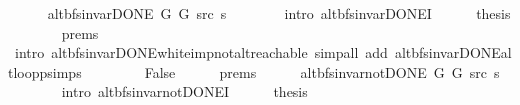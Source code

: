 \begin{isabellebody}
\ \ \ \ \isamarkupfalse%
\ {\isachardoublequoteopen}alt{\isacharunderscore}{\kern0pt}bfs{\isacharunderscore}{\kern0pt}invar{\isacharunderscore}{\kern0pt}DONE{\isacharprime}{\kern0pt}\ G{}\ G{}\ src\ s{\isachardoublequoteclose}\isanewline
\ \ \ \ \ \ \isamarkupfalse%
\ {\isacharparenleft}{\kern0pt}intro\ alt{\isacharunderscore}{\kern0pt}bfs{\isacharunderscore}{\kern0pt}invar{\isacharunderscore}{\kern0pt}DONE{\isacharprime}{\kern0pt}I{\isacharparenright}{\kern0pt}\isanewline
\ \ \ \ \isamarkupfalse%
\ {\isacharquery}{\kern0pt}thesis\isanewline
\ \ \ \ \ \ \isamarkupfalse%
\ {\isachardoublequoteopen}{}{\isachardot}{\kern0pt}prems{\isachardoublequoteclose}{\isacharparenleft}{\kern0pt}{}{\isacharparenright}{\kern0pt}\isanewline
\ \ \ \ \ \ \isamarkupfalse%
\ {\isacharparenleft}{\kern0pt}intro\ alt{\isacharunderscore}{\kern0pt}bfs{\isacharunderscore}{\kern0pt}invar{\isacharunderscore}{\kern0pt}DONE{\isachardot}{\kern0pt}white{\isacharunderscore}{\kern0pt}imp{\isacharunderscore}{\kern0pt}not{\isacharunderscore}{\kern0pt}alt{\isacharunderscore}{\kern0pt}reachable{\isacharparenright}{\kern0pt}\ {\isacharparenleft}{\kern0pt}simp{\isacharunderscore}{\kern0pt}all\ add{\isacharcolon}{\kern0pt}\ alt{\isacharunderscore}{\kern0pt}bfs{\isacharunderscore}{\kern0pt}invar{\isacharunderscore}{\kern0pt}DONE{\isachardot}{\kern0pt}alt{\isacharunderscore}{\kern0pt}loop{\isacharunderscore}{\kern0pt}psimps{\isacharparenright}{\kern0pt}\isanewline
\ \ \isamarkupfalse%
\isanewline
\ \ \ \ \isamarkupfalse%
\ False\isanewline
\ \ \ \ \isamarkupfalse%
\ {\isachardoublequoteopen}{}{\isachardot}{\kern0pt}prems{\isachardoublequoteclose}{\isacharparenleft}{\kern0pt}{}{\isacharparenright}{\kern0pt}\isanewline
\ \ \ \ \isamarkupfalse%
\ {\isachardoublequoteopen}alt{\isacharunderscore}{\kern0pt}bfs{\isacharunderscore}{\kern0pt}invar{\isacharunderscore}{\kern0pt}not{\isacharunderscore}{\kern0pt}DONE{\isacharprime}{\kern0pt}\ G{}\ G{}\ src\ s{\isachardoublequoteclose}\isanewline
\ \ \ \ \ \ \isamarkupfalse%
\ {\isacharparenleft}{\kern0pt}intro\ alt{\isacharunderscore}{\kern0pt}bfs{\isacharunderscore}{\kern0pt}invar{\isacharunderscore}{\kern0pt}not{\isacharunderscore}{\kern0pt}DONE{\isacharprime}{\kern0pt}I{\isacharparenright}{\kern0pt}\isanewline
\ \ \ \ \isamarkupfalse%
\ {\isacharquery}{\kern0pt}thesis\isanewline
\ \ \ \ \ \ \isamarkupfalse%

\end{isabellebody}
